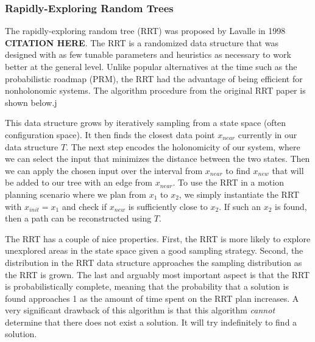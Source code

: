 \subsubsection{Rapidly-Exploring Random Trees} \label{planning:rrt}
The rapidly-exploring random tree (RRT) was proposed by Lavalle in 1998 \textbf{CITATION HERE}. The RRT is a randomized data structure that was designed with as few tunable parameters and heuristics as necessary to work better at the general level. Unlike popular alternatives at the time such as the probabilistic roadmap (PRM), the RRT had the advantage of being efficient for nonholonomic systems. The algorithm procedure from the original RRT paper is shown below.j

{}

This data structure grows by iteratively sampling from a state space (often configuration space). It then finds the closest data point $x_{near}$ currently in our data structure $T$. The next step encodes the holonomicity of our system, where we can select the input that minimizes the distance between the two states. Then we can apply the chosen input over the interval from $x_{near}$ to find $x_{new}$ that will be added to our tree with an edge from $x_{near}$. To use the RRT in a motion planning scenario where we plan from $x_1$ to $x_2$, we simply instantiate the RRT with $x_{init} = x_1$ and check if $x_{new}$ is sufficiently close to $x_2$. If such an $x_2$ is found, then a path can be reconstructed using $T$.

The RRT has a couple of nice properties. First, the RRT is more likely to explore unexplored areas in the state space given a good sampling strategy. Second, the distribution in the RRT data structure approaches the sampling distribution as the RRT is grown. The last and arguably most important aspect is that the RRT is probabilistically complete, meaning that the probability that a solution is found approaches 1 as the amount of time spent on the RRT plan increases. A very significant drawback of this algorithm is that this algorithm \emph{cannot} determine that there does not exist a solution. It will try indefinitely to find a solution.

